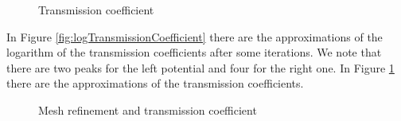 \documentclass[12pt,a4paper,onecolumn]{article}
\theoremstyle{definition}
\theoremstyle{plain}
\begin{document}
\begin{figure}[h!]
 \quad
{}
\caption{Transmission coefficient}\label{fig:transmissionCoefficient}
\end{figure}

In Figure \ref {fig:logTransmissionCoefficient} there are the approximations of the logarithm of the transmission coefficients after some iterations. We note that there are two peaks for the left potential and four for the right one. In Figure \ref {fig:transmissionCoefficient} there are the approximations of the transmission coefficients.

\begin{figure}[h!]
 \quad
{}
\caption{Mesh refinement and transmission coefficient} \label{fig:refinement}
\end{figure}
\end{document}
